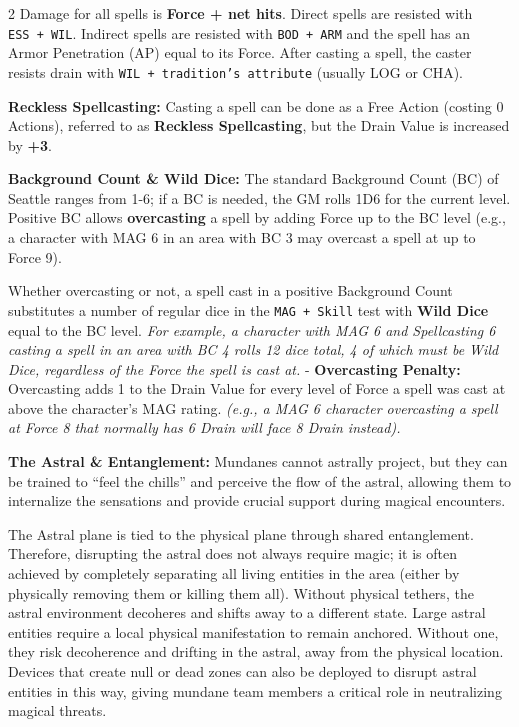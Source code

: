 \documentclass[
  oneside]{article}
\begin{document}
\begin{multicols}{2}
Damage for all spells is \textbf{Force + net
hits}. Direct spells are resisted with
\texttt{ESS\ +\ WIL}. Indirect spells are resisted
with \texttt{BOD\ +\ ARM} and the spell has an
Armor Penetration (AP) equal to its Force. After
casting a spell, the caster resists drain with
\texttt{WIL\ +\ tradition’s\ attribute} (usually
LOG or CHA).

\textbf{Reckless Spellcasting:} Casting a spell
can be done as a Free Action (costing 0 Actions),
referred to as \textbf{Reckless Spellcasting}, but
the Drain Value is increased by \textbf{+3}.

\textbf{Background Count \& Wild Dice:} The
standard Background Count (BC) of Seattle ranges
from 1-6; if a BC is needed, the GM rolls 1D6 for
the current level. Positive BC allows
\textbf{overcasting} a spell by adding Force up to
the BC level (e.g., a character with MAG 6 in an
area with BC 3 may overcast a spell at up to Force
9).

Whether overcasting or not, a spell cast in a
positive Background Count substitutes a number of
regular dice in the \texttt{MAG\ +\ Skill} test
with \textbf{Wild Dice} equal to the BC level.
\emph{For example, a character with MAG 6 and
Spellcasting 6 casting a spell in an area with BC
4 rolls 12 dice total, 4 of which must be Wild
Dice, regardless of the Force the spell is cast
at.} - \textbf{Overcasting Penalty:} Overcasting
adds 1 to the Drain Value for every level of Force
a spell was cast at above the character's MAG
rating. \emph{(e.g., a MAG 6 character overcasting
a spell at Force 8 that normally has 6 Drain will
face 8 Drain instead).}

\textbf{The Astral \& Entanglement:} Mundanes
cannot astrally project, but they can be trained
to ``feel the chills'' and perceive the flow of
the astral, allowing them to internalize the
sensations and provide crucial support during
magical encounters.

The Astral plane is tied to the physical plane
through shared entanglement. Therefore, disrupting
the astral does not always require magic; it is
often achieved by completely separating all living
entities in the area (either by physically
removing them or killing them all). Without
physical tethers, the astral environment decoheres
and shifts away to a different state. Large astral
entities require a local physical manifestation to
remain anchored. Without one, they risk
decoherence and drifting in the astral, away from
the physical location. Devices that create null or
dead zones can also be deployed to disrupt astral
entities in this way, giving mundane team members
a critical role in neutralizing magical threats.


\end{multicols}
\end{document}
